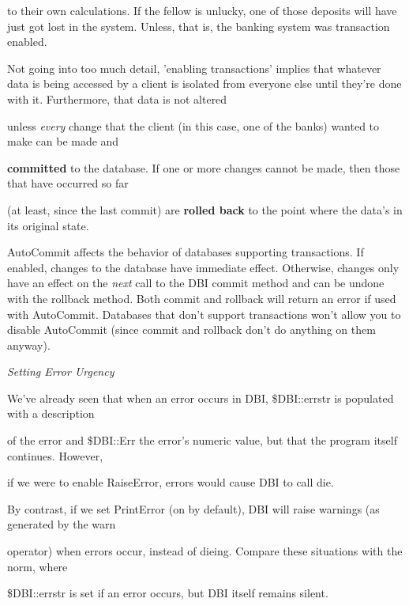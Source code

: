 \documentclass[a4paper,11pt]{book}
\begin{document}
\noindent to their own calculations. If the fellow is unlucky, one of those deposits will have just got lost in the system. Unless, that is, the banking system was transaction enabled.

\noindent 

\noindent Not going into too much detail, 'enabling transactions' implies that whatever data is being accessed by a client is isolated from everyone else until they're done with it. Furthermore, that data is not altered

\noindent unless \textit{every }change that the client (in this case, one of the banks) wanted to make can be made and

\noindent \textbf{committed }to the database. If one or more changes cannot be made, then those that have occurred so far

\noindent (at least, since the last commit) are \textbf{rolled back }to the point where the data's in its original state.

\noindent 

\noindent AutoCommit affects the behavior of databases supporting transactions. If enabled, changes to the database have immediate effect. Otherwise, changes only have an effect on the \textit{next }call to the DBI commit method and can be undone with the rollback method. Both commit and rollback will return an error if used with AutoCommit. Databases that don't support transactions won't allow you to disable AutoCommit (since commit and rollback don't do anything on them anyway).

\noindent 

\noindent \textit{Setting Error Urgency}

\noindent We've already seen that when an error occurs in DBI, \$DBI::errstr is populated with a description

\noindent of the error and \$DBI::Err the error's numeric value, but that the program itself continues. However,

\noindent if we were to enable RaiseError, errors would cause DBI to call die.

\noindent 

\noindent By contrast, if we set PrintError (on by default), DBI will raise warnings (as generated by the warn

\noindent operator) when errors occur, instead of dieing. Compare these situations with the norm, where

\noindent \$DBI::errstr is set if an error occurs, but DBI itself remains silent.
\end{document}
